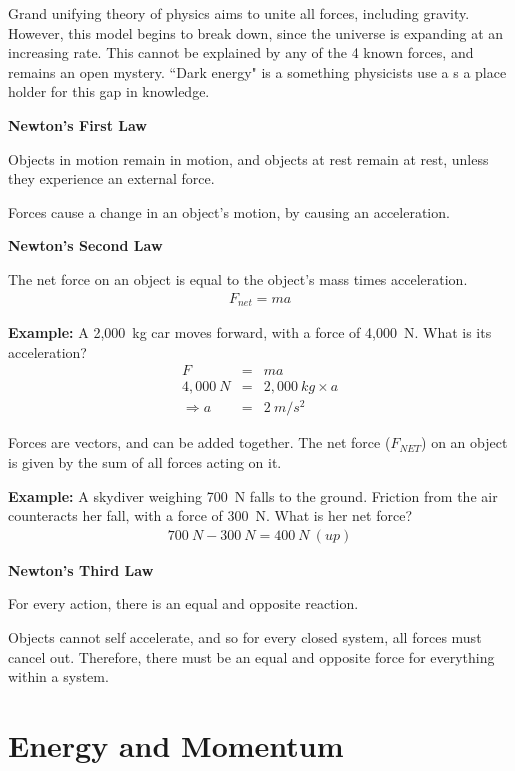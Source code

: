\documentclass[12pt]{article}
\begin{document}
Grand unifying theory of physics aims to unite all forces, including gravity. However, this model begins to break down, since the universe is expanding at an increasing rate. This cannot be explained by any of the 4 known forces, and remains an open mystery. ``Dark energy" is a something physicists use a s a place holder for this gap in knowledge.

\textbf{Newton's First Law}

Objects in motion remain in motion, and objects at rest remain at rest, unless they experience an external force. 

Forces cause a change in an object's motion, by causing an acceleration.

\textbf{Newton's Second Law}

The net force on an object is equal to the object's mass times acceleration.
\begin{eqnarray}
	F_{net} = m a \nonumber
\end{eqnarray}

\textbf{Example:} A 2,000~kg car moves forward, with a force of 4,000~N. What is its acceleration?
\begin{eqnarray}
F &=& m a \nonumber \\
4,000~N &=& 2,000~kg \times a \nonumber  \\
\Rightarrow a &=& 2~m/s^2 \nonumber
\end{eqnarray}

Forces are vectors, and can be added together. The net force ($F_{NET}$) on an object is given by the sum of all forces acting on it.

\textbf{Example:} A skydiver weighing 700~N falls to the ground. Friction from the air counteracts her fall, with a force of 300~N. What is her net force?
\begin{eqnarray}
	700~N - 300~N = 400~N~(up) \nonumber
\end{eqnarray}


\textbf{Newton's Third Law}

For every action, there is an equal and opposite reaction.

Objects cannot self accelerate, and so for every closed system, all forces must cancel out. Therefore, there must be an equal and opposite force for everything within a system.

\section{Energy and Momentum}
\end{document}
